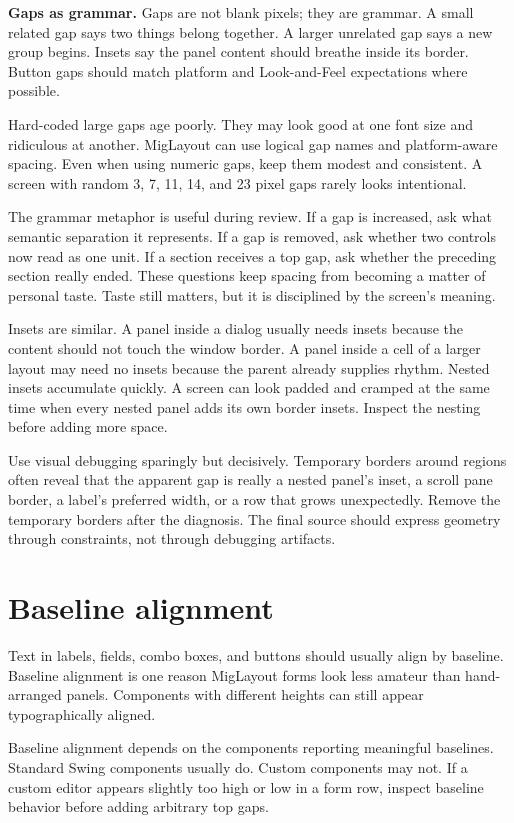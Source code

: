 \textbf{Gaps as grammar.}
Gaps are not blank pixels; they are grammar. A small related gap says two things belong together. A larger unrelated gap says a new group begins. Insets say the panel content should breathe inside its border. Button gaps should match platform and Look-and-Feel expectations where possible.

Hard-coded large gaps age poorly. They may look good at one font size and ridiculous at another. MigLayout can use logical gap names and platform-aware spacing. Even when using numeric gaps, keep them modest and consistent. A screen with random 3, 7, 11, 14, and 23 pixel gaps rarely looks intentional.

The grammar metaphor is useful during review. If a gap is increased, ask what
semantic separation it represents. If a gap is removed, ask whether two controls
now read as one unit. If a section receives a top gap, ask whether the preceding
section really ended. These questions keep spacing from becoming a matter of
personal taste. Taste still matters, but it is disciplined by the screen's
meaning.

Insets are similar. A panel inside a dialog usually needs insets because the
content should not touch the window border. A panel inside a cell of a larger
layout may need no insets because the parent already supplies rhythm. Nested
insets accumulate quickly. A screen can look padded and cramped at the same time
when every nested panel adds its own border insets. Inspect the nesting before
adding more space.

Use visual debugging sparingly but decisively. Temporary borders around regions
often reveal that the apparent gap is really a nested panel's inset, a scroll
pane border, a label's preferred width, or a row that grows unexpectedly. Remove
the temporary borders after the diagnosis. The final source should express
geometry through constraints, not through debugging artifacts.

\section{Baseline alignment}

Text in labels, fields, combo boxes, and buttons should usually align by baseline. Baseline alignment is one reason MigLayout forms look less amateur than hand-arranged panels. Components with different heights can still appear typographically aligned.

Baseline alignment depends on the components reporting meaningful baselines. Standard Swing components usually do. Custom components may not. If a custom editor appears slightly too high or low in a form row, inspect baseline behavior before adding arbitrary top gaps.

